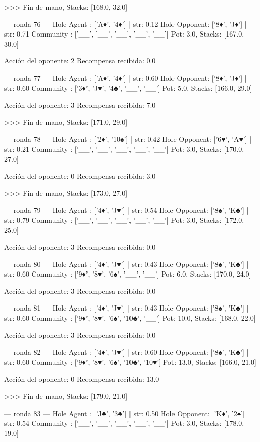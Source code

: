 >>> Fin de mano, Stacks: [168.0, 32.0]


--- ronda 76 ---
Hole Agent : ['A♦', '4♦'] | str: 0.12
Hole Opponent: ['8♦', 'J♦'] | str: 0.71
Community  : ['__', '__', '__', '__', '__']
Pot: 3.0, Stacks: [167.0, 30.0]

Acción del oponente: 2
Recompensa recibida: 0.0

--- ronda 77 ---
Hole Agent : ['A♦', '4♦'] | str: 0.60
Hole Opponent: ['8♦', 'J♦'] | str: 0.60
Community  : ['3♦', 'J♥', '4♣', '__', '__']
Pot: 5.0, Stacks: [166.0, 29.0]

Acción del oponente: 3
Recompensa recibida: 7.0

>>> Fin de mano, Stacks: [171.0, 29.0]


--- ronda 78 ---
Hole Agent : ['2♦', '10♠'] | str: 0.42
Hole Opponent: ['6♥', 'A♥'] | str: 0.21
Community  : ['__', '__', '__', '__', '__']
Pot: 3.0, Stacks: [170.0, 27.0]

Acción del oponente: 0
Recompensa recibida: 3.0

>>> Fin de mano, Stacks: [173.0, 27.0]


--- ronda 79 ---
Hole Agent : ['4♦', 'J♥'] | str: 0.54
Hole Opponent: ['8♠', 'K♣'] | str: 0.79
Community  : ['__', '__', '__', '__', '__']
Pot: 3.0, Stacks: [172.0, 25.0]

Acción del oponente: 3
Recompensa recibida: 0.0

--- ronda 80 ---
Hole Agent : ['4♦', 'J♥'] | str: 0.43
Hole Opponent: ['8♠', 'K♣'] | str: 0.60
Community  : ['9♦', '8♥', '6♠', '__', '__']
Pot: 6.0, Stacks: [170.0, 24.0]

Acción del oponente: 3
Recompensa recibida: 0.0

--- ronda 81 ---
Hole Agent : ['4♦', 'J♥'] | str: 0.43
Hole Opponent: ['8♠', 'K♣'] | str: 0.60
Community  : ['9♦', '8♥', '6♠', '10♣', '__']
Pot: 10.0, Stacks: [168.0, 22.0]

Acción del oponente: 3
Recompensa recibida: 0.0

--- ronda 82 ---
Hole Agent : ['4♦', 'J♥'] | str: 0.60
Hole Opponent: ['8♠', 'K♣'] | str: 0.60
Community  : ['9♦', '8♥', '6♠', '10♣', '10♥']
Pot: 13.0, Stacks: [166.0, 21.0]

Acción del oponente: 0
Recompensa recibida: 13.0

>>> Fin de mano, Stacks: [179.0, 21.0]


--- ronda 83 ---
Hole Agent : ['J♣', '3♣'] | str: 0.50
Hole Opponent: ['K♦', '2♠'] | str: 0.54
Community  : ['__', '__', '__', '__', '__']
Pot: 3.0, Stacks: [178.0, 19.0]

